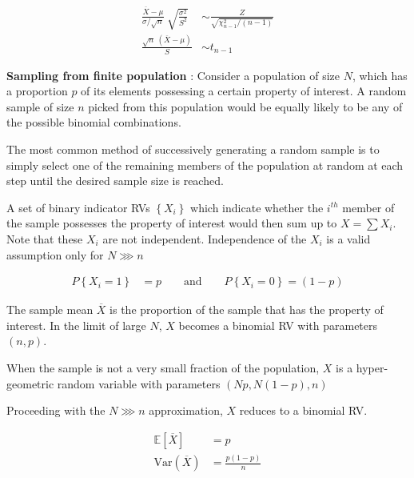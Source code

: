 \begin{align}
	\frac{\overline{X}- \mu}{\sigma / \sqrt{n}}\ \sqrt{\frac{\sigma^2}{S^2}} &\sim \frac{Z}{\sqrt{\chi^2_{n-1} / (n-1)}} \nonumber \\
	\frac{\sqrt{n}\ (\overline{X}- \mu)}{S} &\sim t_{n-1}
\end{align}

\textbf{Sampling from finite population} : Consider a population of size $ N $, which has a proportion $ p $ of its elements possessing a certain property of interest. A random sample of size $ n $ picked from this population would be equally likely to be any of the possible binomial combinations.

The most common method of successively generating a random sample is to simply select one of the remaining members of the population at random at each step until the desired sample size is reached.

A set of binary indicator RVs $ \left\{X_i\right\} $ which indicate whether the $ i^{th} $ member of the sample possesses the property of interest would then sum up to $ X = \sum X_i $. Note that these $ X_i $ are not independent. Independence of the $ X_i $ is a valid assumption only for $ N \ggg n $

\begin{align}
	P\left\{X_i = 1\right\} &= p \qquad \text{and} \qquad P\left\{X_i = 0\right\} = (1-p)
\end{align}

The sample mean $ \overline{X} $ is the proportion of the sample that has the property of interest. In the limit of large $ N $, $ X $ becomes a binomial RV with parameters $ (n, p) $.

When the sample is not a very small fraction of the population, $ X $ is a hyper-geometric random variable with parameters $ (Np, N(1-p), n) $

Proceeding with the $ N \ggg n $ approximation, $ X $ reduces to a binomial RV.

\begin{align}
	\mathbb{E}[\overline{X}] &= p \\
	\mathrm{Var}(\overline{X}) &= \frac{p(1-p)}{n}
\end{align}

